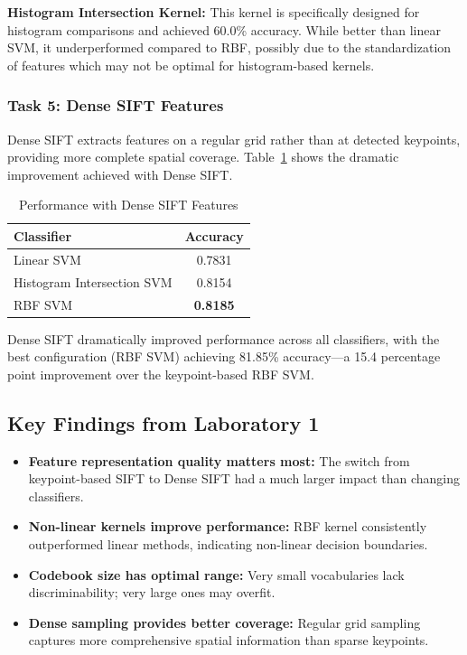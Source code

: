 \documentclass[conference]{IEEEtran}
\begin{document}
\textbf{Histogram Intersection Kernel:} This kernel is specifically designed for histogram comparisons and achieved 60.0\% accuracy. While better than linear SVM, it underperformed compared to RBF, possibly due to the standardization of features which may not be optimal for histogram-based kernels.

\subsubsection{Task 5: Dense SIFT Features}

Dense SIFT extracts features on a regular grid rather than at detected keypoints, providing more complete spatial coverage. Table~\ref{tab:lab1_dense_sift} shows the dramatic improvement achieved with Dense SIFT.

\begin{table}[H]
\centering
\caption{Performance with Dense SIFT Features}
\label{tab:lab1_dense_sift}
\begin{tabular}{@{}lc@{}}
\toprule
\textbf{Classifier} & \textbf{Accuracy} \\ \midrule
Linear SVM & 0.7831 \\
Histogram Intersection SVM & 0.8154 \\
RBF SVM & \textbf{0.8185} \\ \bottomrule
\end{tabular}
\end{table}

Dense SIFT dramatically improved performance across all classifiers, with the best configuration (RBF SVM) achieving 81.85\% accuracy—a 15.4 percentage point improvement over the keypoint-based RBF SVM.

\subsection{Key Findings from Laboratory 1}

\begin{itemize}
\item \textbf{Feature representation quality matters most:} The switch from keypoint-based SIFT to Dense SIFT had a much larger impact than changing classifiers.
\item \textbf{Non-linear kernels improve performance:} RBF kernel consistently outperformed linear methods, indicating non-linear decision boundaries.
\item \textbf{Codebook size has optimal range:} Very small vocabularies lack discriminability; very large ones may overfit.
\item \textbf{Dense sampling provides better coverage:} Regular grid sampling captures more comprehensive spatial information than sparse keypoints.
\end{itemize}
\end{document}
